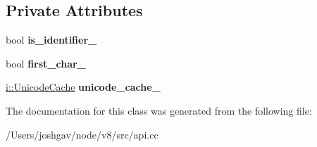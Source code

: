 \subsection*{Private Attributes}
\begin{DoxyCompactItemize}
\item 
bool {\bfseries is\+\_\+identifier\+\_\+}\hypertarget{classv8_1_1_is_identifier_helper_a7cfa4b0a191ef84952810b72575fdc87}{}\label{classv8_1_1_is_identifier_helper_a7cfa4b0a191ef84952810b72575fdc87}

\item 
bool {\bfseries first\+\_\+char\+\_\+}\hypertarget{classv8_1_1_is_identifier_helper_af1e1306aef2df8713005ea25e856d9e5}{}\label{classv8_1_1_is_identifier_helper_af1e1306aef2df8713005ea25e856d9e5}

\item 
\hyperlink{classv8_1_1internal_1_1_unicode_cache}{i\+::\+Unicode\+Cache} {\bfseries unicode\+\_\+cache\+\_\+}\hypertarget{classv8_1_1_is_identifier_helper_a6971bba7adf6b3c814457a40f4fa7079}{}\label{classv8_1_1_is_identifier_helper_a6971bba7adf6b3c814457a40f4fa7079}

\end{DoxyCompactItemize}


The documentation for this class was generated from the following file\+:\begin{DoxyCompactItemize}
\item 
/\+Users/joshgav/node/v8/src/api.\+cc\end{DoxyCompactItemize}
